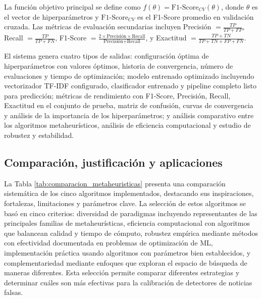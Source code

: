 La función objetivo principal se define como $f(\theta) = \text{F1-Score}_{CV}(\theta)$, donde $\theta$ es el vector de hiperparámetros y $\text{F1-Score}_{CV}$ es el F1-Score promedio en validación cruzada. Las métricas de evaluación secundarias incluyen Precisión $= \frac{TP}{TP + FP}$, Recall $= \frac{TP}{TP + FN}$, F1-Score $= \frac{2 \times \text{Precisión} \times \text{Recall}}{\text{Precisión} + \text{Recall}}$, y Exactitud $= \frac{TP + TN}{TP + TN + FP + FN}$.

El sistema genera cuatro tipos de salidas: configuración óptima de hiperparámetros con valores óptimos, historia de convergencia, número de evaluaciones y tiempo de optimización; modelo entrenado optimizado incluyendo vectorizador TF-IDF configurado, clasificador entrenado y pipeline completo listo para predicción; métricas de rendimiento con F1-Score, Precisión, Recall, Exactitud en el conjunto de prueba, matriz de confusión, curvas de convergencia y análisis de la importancia de los hiperparámetros; y análisis comparativo entre los algoritmos metaheurísticos, análisis de eficiencia computacional y estudio de robustez y estabilidad.

\subsection{Comparación, justificación y aplicaciones}

La Tabla \ref{tab:comparacion_metaheuristicas} presenta una comparación sistemática de los cinco algoritmos implementados, destacando sus inspiraciones, fortalezas, limitaciones y parámetros clave. La selección de estos algoritmos se basó en cinco criterios: diversidad de paradigmas incluyendo representantes de las principales familias de metaheurísticas, eficiencia computacional con algoritmos que balancean calidad y tiempo de cómputo, robustez empírica mediante métodos con efectividad documentada en problemas de optimización de ML, implementación práctica usando algoritmos con parámetros bien establecidos, y complementariedad mediante enfoques que exploran el espacio de búsqueda de maneras diferentes. Esta selección permite comparar diferentes estrategias y determinar cuáles son más efectivas para la calibración de detectores de noticias falsas.

